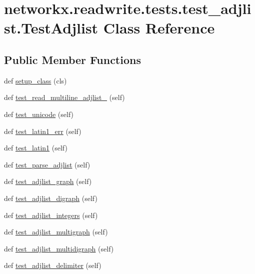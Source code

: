 \hypertarget{classnetworkx_1_1readwrite_1_1tests_1_1test__adjlist_1_1TestAdjlist}{}\section{networkx.\+readwrite.\+tests.\+test\+\_\+adjlist.\+Test\+Adjlist Class Reference}
\label{classnetworkx_1_1readwrite_1_1tests_1_1test__adjlist_1_1TestAdjlist}
\subsection*{Public Member Functions}
\begin{DoxyCompactItemize}
\item 
def \hyperlink{classnetworkx_1_1readwrite_1_1tests_1_1test__adjlist_1_1TestAdjlist_ae922044cd1cfa4670a569bb7ea6d17f5}{setup\+\_\+class} (cls)
\item 
def \hyperlink{classnetworkx_1_1readwrite_1_1tests_1_1test__adjlist_1_1TestAdjlist_a8a9267b6fa7a4d56a7d101a3adc37695}{test\+\_\+read\+\_\+multiline\+\_\+adjlist\+\_} (self)
\item 
def \hyperlink{classnetworkx_1_1readwrite_1_1tests_1_1test__adjlist_1_1TestAdjlist_a7af24dd81f184b2fa9c5e50110777e65}{test\+\_\+unicode} (self)
\item 
def \hyperlink{classnetworkx_1_1readwrite_1_1tests_1_1test__adjlist_1_1TestAdjlist_a2dc89ad5ca1d12650f41eff4a620acc1}{test\+\_\+latin1\+\_\+err} (self)
\item 
def \hyperlink{classnetworkx_1_1readwrite_1_1tests_1_1test__adjlist_1_1TestAdjlist_a812df54a065bff8fb258b247ccebe976}{test\+\_\+latin1} (self)
\item 
def \hyperlink{classnetworkx_1_1readwrite_1_1tests_1_1test__adjlist_1_1TestAdjlist_ada42bc731ee534b64137655132615271}{test\+\_\+parse\+\_\+adjlist} (self)
\item 
def \hyperlink{classnetworkx_1_1readwrite_1_1tests_1_1test__adjlist_1_1TestAdjlist_ad655685b15ad97d1ec1d909dff80088e}{test\+\_\+adjlist\+\_\+graph} (self)
\item 
def \hyperlink{classnetworkx_1_1readwrite_1_1tests_1_1test__adjlist_1_1TestAdjlist_ac873c336436556e7233dcc8876f3f214}{test\+\_\+adjlist\+\_\+digraph} (self)
\item 
def \hyperlink{classnetworkx_1_1readwrite_1_1tests_1_1test__adjlist_1_1TestAdjlist_a059fc4db8155edb39039806f51f2a198}{test\+\_\+adjlist\+\_\+integers} (self)
\item 
def \hyperlink{classnetworkx_1_1readwrite_1_1tests_1_1test__adjlist_1_1TestAdjlist_ad3bd4144f94cb32cac9e5f7de2dd1af4}{test\+\_\+adjlist\+\_\+multigraph} (self)
\item 
def \hyperlink{classnetworkx_1_1readwrite_1_1tests_1_1test__adjlist_1_1TestAdjlist_a6e9132f4ba145965baa8d8fcac08052f}{test\+\_\+adjlist\+\_\+multidigraph} (self)
\item 
def \hyperlink{classnetworkx_1_1readwrite_1_1tests_1_1test__adjlist_1_1TestAdjlist_a19130a072b70e58fee059c90230f1496}{test\+\_\+adjlist\+\_\+delimiter} (self)
\end{DoxyCompactItemize}
